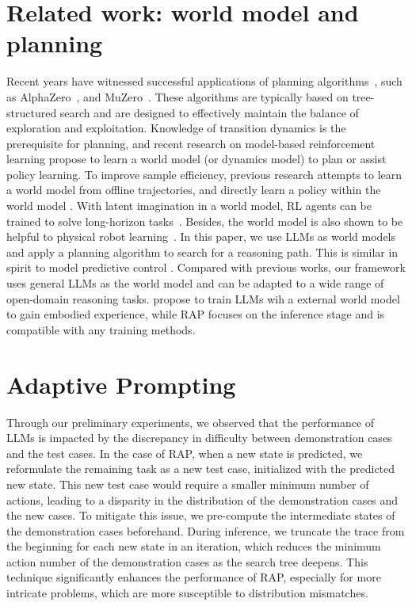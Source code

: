 \section{Related work: world model and planning}
\label{sec:related_planning}
Recent years have witnessed successful applications of planning algorithms~\cite{sekar2020planning}, such as AlphaZero~\cite{silver2017mastering}, and MuZero~\cite{schrittwieser2020mastering}. These algorithms are typically based on tree-structured search and are designed to effectively maintain the balance of exploration and exploitation. Knowledge of transition dynamics is the prerequisite for planning, and recent research on model-based reinforcement learning propose to learn a world model (or dynamics model) to plan or assist policy learning. To improve sample efficiency, previous research attempts to learn a world model from offline trajectories, and directly learn a policy within the world model \cite{ha2018recurrent, ha2018world}. With latent imagination in a world model, RL agents can be trained to solve long-horizon tasks~\cite{hafner2019dream, hafner2020mastering}. Besides, the world model is also shown to be helpful to physical robot learning~\cite{wu2023daydreamer}. In this paper, we use LLMs as world models and apply a planning algorithm to search for a reasoning path. This is similar in spirit to model predictive control \cite{camacho2013model}. Compared with previous works, our framework uses general LLMs as the world model and can be adapted to a wide range of open-domain reasoning tasks. \citet{xiang2023language} propose to train LLMs wih a external world model to gain embodied experience, while RAP focuses on the inference stage and is compatible with any training methods.

\section{Adaptive Prompting}
\label{sec:adaptive}
Through our preliminary experiments, we observed that the performance of LLMs is impacted by the discrepancy in difficulty between demonstration cases and the test cases. In the case of RAP, when a new state is predicted, we reformulate the remaining task as a new test case, initialized with the predicted new state. This new test case would require a smaller minimum number of actions, leading to a disparity in the distribution of the demonstration cases and the new cases. To mitigate this issue, we pre-compute the intermediate states of the demonstration cases beforehand. During inference, we truncate the trace from the beginning for each new state in an iteration, which reduces the minimum action number of the demonstration cases as the search tree deepens. This technique significantly enhances the performance of RAP, especially for more intricate problems, which are more susceptible to distribution mismatches.


